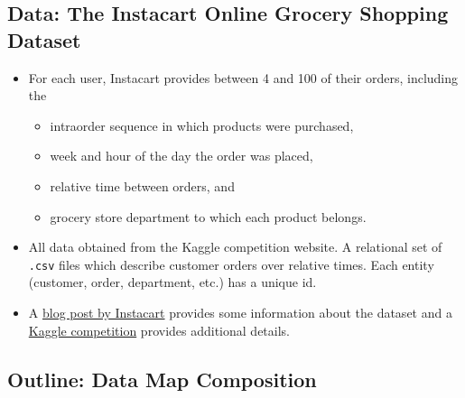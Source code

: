 \documentclass[handout]{beamer}
\begin{document}
\subsection%
{Data: The Instacart Online Grocery Shopping Dataset}
\label{data-the-instacart-online-grocery-shopping-dataset}

\begin{frame}%

\begin{itemize}[<+->]
\item For each user, Instacart
provides between 4 and 100 of their orders, including the 
\begin{itemize}
\item intraorder sequence in which products were purchased, 
\item week and hour of the day the order was placed, 
\item relative time between orders, and
\item grocery store department to which each product belongs. 
\end{itemize}
\vfill

\item All data obtained from the Kaggle competition website. A relational 
set of \texttt{.csv} files which describe customer orders over
relative times. Each entity (customer, order, department, etc.) has a
unique id.
\vfill

\item A
\href{https://tech.instacart.com/3-million-instacart-orders-open-sourced-d40d29ead6f2}{blog
  post by Instacart} provides some information about the dataset and a
\href{https://www.kaggle.com/c/instacart-market-basket-analysis/overview}{Kaggle
  competition} provides additional details.


\end{itemize}

\end{frame}


  \subsection{Outline: Data Map Composition
}\label{outline-data-map-composition}
\end{document}
